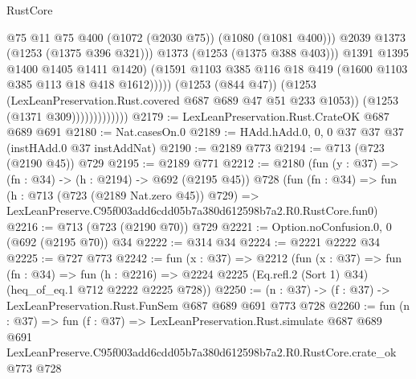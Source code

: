 \begin{lexlean}{RustCore}
\begin{coremodule}
                                        @75
                                        @11
                                        @75
                                        @400
                                        (@1072 (@2030 @75))
                                        (@1080 (@1081 @400)))
                                      @2039
                                      @1373
                                      (@1253 (@1375 @396 @321)))
                                    @1373
                                    (@1253 (@1375 @388 @403)))
                                  @1391
                                  @1395
                                  @1400
                                  @1405
                                  @1411
                                  @1420)
                                (@1591
                                  @1103
                                  @385
                                  @116
                                  @18
                                  @419
                                  (@1600 @1103 @385 @113 @18 @418 @1612)))))
                          (@1253 (@844 @47))
                          (@1253 (LexLeanPreservation.Rust.covered @687 @689 @47 @51 @233 @1053))
                          (@1253 (@1371 @309)))))))))))))
@2179 := LexLeanPreservation.Rust.CrateOK @687 @689 @691
@2180 := Nat.casesOn.{0}
@2189 := HAdd.hAdd.{0, 0, 0} @37 @37 @37 (instHAdd.{0} @37 instAddNat)
@2190 := @2189 @773
@2194 := @713 (@723 (@2190 @45)) @729
@2195 := @2189 @771
@2212 := @2180
    (fun (y : @37) => (fn : @34) -> (h : @2194) -> @692 (@2195 @45))
    @728
    (fun (fn : @34) =>
    fun (h : @713 (@723 (@2189 Nat.zero @45)) @729) =>
    LexLeanPreserve.C95f003add6cdd05b7a380d612598b7a2.R0.RustCore.fun0)
@2216 := @713 (@723 (@2190 @70)) @729
@2221 := Option.noConfusion.{0, 0} (@692 (@2195 @70)) @34
@2222 := @314 @34
@2224 := @2221 @2222 @34
@2225 := @727 @773
@2242 := fun (x : @37) =>
  @2212
    (fun (x : @37) =>
    fun (fn : @34) =>
    fun (h : @2216) => @2224 @2225 (Eq.refl.{2} (Sort 1) @34) (heq_of_eq.{1} @712 @2222 @2225 @728))
@2250 := (n : @37) -> (f : @37) -> LexLeanPreservation.Rust.FunSem @687 @689 @691 @773 @728
@2260 := fun (n : @37) =>
  fun (f : @37) =>
  LexLeanPreservation.Rust.simulate
    @687
    @689
    @691
    LexLeanPreserve.C95f003add6cdd05b7a380d612598b7a2.R0.RustCore.crate_ok
    @773
    @728
\end{coremodule}
\end{lexlean}

